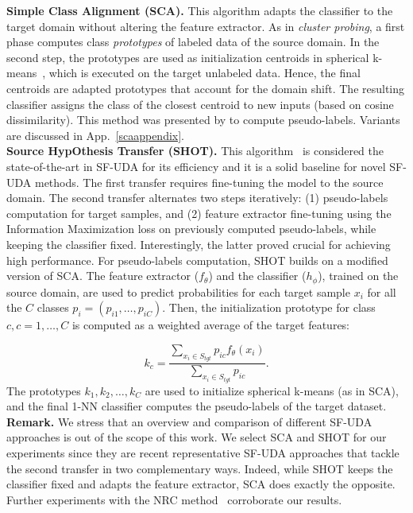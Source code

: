 \documentclass{article}
\begin{document}
\textbf{Simple Class Alignment (SCA).} This algorithm adapts the classifier to the target domain without altering the feature extractor. 
As in \textit{cluster probing}, a first phase computes class \textit{prototypes} of labeled data of the source domain. In the second step, the prototypes are used as initialization centroids in spherical k-means~\citep{hornik2012spherical}, which is executed on the target unlabeled data. 
Hence, the final centroids are adapted prototypes that account for the domain shift.
The resulting classifier assigns 
the class of the closest centroid to new inputs (based on cosine dissimilarity). 
This method was presented by \cite{kang2019contrastive} to compute pseudo-labels. 
Variants are discussed in App.~\ref{scaappendix}.\\
\textbf{Source HypOthesis Transfer (SHOT).} This algorithm~\citep{liang2020we, liang2021source} is considered the state-of-the-art in SF-UDA for its efficiency and it is a solid baseline for novel SF-UDA methods. 
The first transfer requires fine-tuning the model to the source domain. 
The second transfer alternates two steps iteratively: (1) pseudo-labels computation for target samples, and (2) feature extractor fine-tuning using the Information Maximization loss on previously computed pseudo-labels, while keeping the classifier fixed. 
Interestingly, the latter 
proved crucial
for achieving high performance.
For pseudo-labels computation, SHOT builds on a modified version of SCA. 
The feature extractor ($f_\theta$) and the classifier ($h_\phi$), trained on the source domain, are used to predict probabilities for each target sample $x_i$ for all the $C$ classes $p_i = (p_{i1}, \ldots, p_{iC})$.
Then, the initialization prototype for class $c, c=1, \dots, C$ is computed as a weighted average of the target features:

\vspace{-0.3cm}
\begin{equation}
    k_c = \frac{\sum_{x_i \in S_{tgt}} p_{ic} f_{\theta}(x_i)}{\sum_{x_i \in S_{tgt}} p_{ic}}.
\end{equation}
The prototypes $k_1, k_2, \ldots, k_C$ are used to initialize spherical k-means (as in SCA), and the final 1-NN classifier  computes the pseudo-labels of the target dataset.\\
\textbf{Remark.} We stress that an overview and comparison of different SF-UDA approaches is out of the scope of this work. We select SCA and SHOT for our experiments since they are recent representative SF-UDA approaches that tackle the second transfer in two complementary ways. 
Indeed, while SHOT keeps the classifier fixed and adapts the feature extractor, SCA does exactly the opposite. Further experiments with the NRC method~\citep{yang2021exploiting} corroborate our results.
\end{document}

